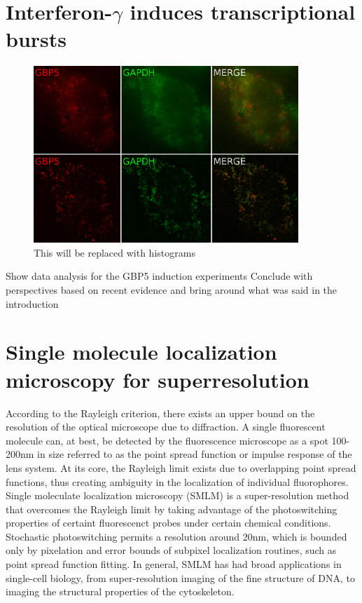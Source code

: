 \documentclass{article}
\begin{document}
\section{Interferon-$\gamma$ induces transcriptional bursts}

\begin{figure}
\centering
\includegraphics[width=10cm]{Stains.png}
\caption{This will be replaced with histograms}
\end{figure}

Show data analysis for the GBP5 induction experiments
Conclude with perspectives based on recent evidence and bring around what was said in the introduction

\section{Single molecule localization microscopy for superresolution}

According to the Rayleigh criterion, there exists an upper bound on the resolution of the optical microscope due to diffraction. A single fluorescent molecule can, at best, be detected by the fluorescence microscope as a spot 100-200nm in size referred to as the point spread function or impulse response of the lens system. At its core, the Rayleigh limit exists due to overlapping point spread functions, thus creating ambiguity in the localization of individual fluorophores. Single moleculate localization microscopy (SMLM) is a super-resolution method that overcomes the Rayleigh limit by taking advantage of the photoswitching properties of certaint fluorescenct probes under certain chemical conditions. Stochastic photoswitching permits a resolution around 20nm, which is bounded only by pixelation and error bounds of subpixel localization routines, such as point spread function fitting. In general, SMLM has had broad applications in single-cell biology, from super-resolution imaging of the fine structure of DNA, to imaging the structural properties of the cytoskeleton.
\end{document}
